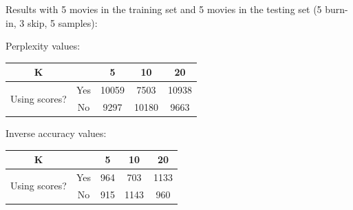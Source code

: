 \documentclass[a4paper,10pt]{report}
\begin{document}
Results with 5 movies in the training set and 5 movies in the testing set (5 burn-in, 3 skip, 5 samples):

Perplexity values:



\begin{center}
	\begin{tabular}{cc|ccc}
	K &  & 5 & 10 & 20 \\ \hline
	\multirow{2}{*}{Using scores?} & Yes & 10059 & 7503 & 10938   \\
	& No  & 9297 & 10180 & 9663   \\
	\end{tabular}
\end{center}

Inverse accuracy values:

\begin{center}
	\begin{tabular}{cc|ccc}
	K &  & 5 & 10 & 20 \\ \hline
	\multirow{2}{*}{Using scores?} & Yes & 964 & 703 & 1133   \\
	& No  & 915 & 1143 & 960   \\
	\end{tabular}
\end{center}
\end{document}
